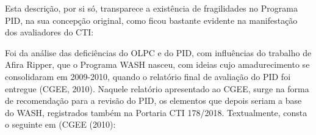 \documentclass[
12pt,		%
openright,	%
twoside,  %
a4paper,			%
chapter=TITLE,		%
english,			%
french,				%
spanish,			%
brazil				%
]{USPSC-classe/USPSC}
\begin{document}
Esta descri\c{c}\~ao, por si s\'o, transparece a exist\^encia de fragilidades no Programa PID, na sua concep\c{c}\~ao original, como ficou bastante evidente na manifesta\c{c}\~ao dos avaliadores do CTI:


















\noindent\begin{center}\mbox{\centering{}}\end{center}


Foi da an\'alise das defici\^encias do OLPC e do PID, com influ\^encias do trabalho de Afira Ripper, que o Programa WASH nasceu, com ideias cujo amadurecimento se consolidaram em 2009-2010, quando o relat\'orio final de avalia\c{c}\~ao do PID foi entregue (CGEE, 2010). Naquele relat\'orio apresentado ao CGEE, surge na forma de recomenda\c{c}\~ao para a revis\~ao do PID, os elementos que depois seriam a base do WASH, registrados tamb\'em na Portaria CTI 178/2018. Textualmente, consta o seguinte em (CGEE (2010):
\end{document}
